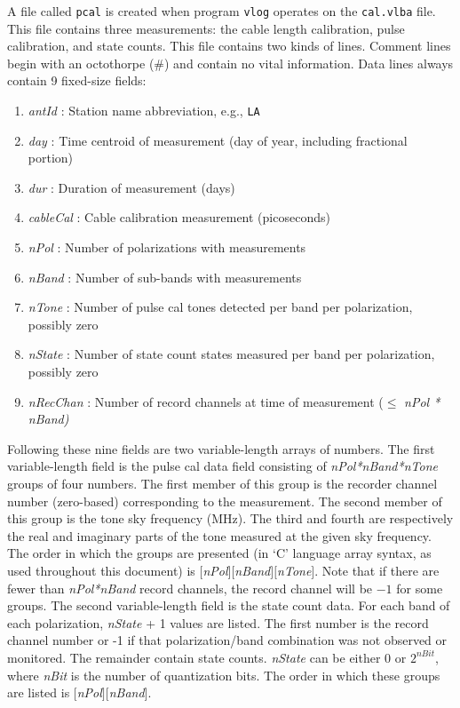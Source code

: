 A file called {\tt pcal} is created when program {\tt vlog} operates on the {\tt cal.vlba} file.
This file contains three measurements: the cable length calibration, pulse calibration, and state counts.
This file contains two kinds of lines.
Comment lines begin with an octothorpe (\#) and contain no vital information.
Data lines always contain 9 fixed-size fields:
\begin{enumerate}
\item {\em antId} : Station name abbreviation, e.g., {\tt LA}
\item {\em day} : Time centroid of measurement (day of year, including fractional portion)
\item {\em dur} : Duration of measurement (days)
\item {\em cableCal} : Cable calibration measurement (picoseconds)
\item {\em nPol} : Number of polarizations with measurements 
\item {\em nBand} : Number of sub-bands with measurements 
\item {\em nTone} : Number of pulse cal tones detected per band per polarization, possibly zero 
\item {\em nState} : Number of state count states measured per band per polarization, possibly zero
\item {\em nRecChan} : Number of record channels at time of measurement ($\le$ \em{nPol * nBand})
\end{enumerate}
Following these nine fields are two variable-length arrays of numbers.
The first variable-length field is the pulse cal data field consisting of {\em nPol*nBand*nTone} groups of four numbers.
The first member of this group is the recorder channel number (zero-based) corresponding to the measurement.
The second member of this group is the tone sky frequency (MHz).
The third and fourth are respectively the real and imaginary parts of the tone measured at the given sky frequency.
The order in which the groups are presented (in `C' language array syntax, as used throughout this document) is $[${\em nPol}$][${\em nBand}$][${\em nTone}$]$.
Note that if there are fewer than {\em nPol*nBand} record channels, the record channel will be $-1$ for some groups.
The second variable-length field is the state count data.
For each band of each polarization, {\em nState} + 1 values are listed.
The first number is the record channel number or -1 if that polarization/band combination was not observed or monitored.
The remainder contain state counts.
{\em nState} can be either 0 or $2^{\mathit nBit}$, where {\em nBit} is the number of quantization bits.
The order in which these groups are listed is $[${\em nPol}$][${\em nBand}$]$.







